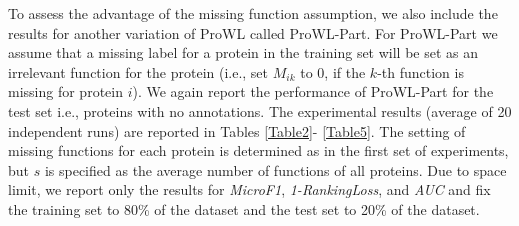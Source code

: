 \documentclass{llncs} %
\begin{document}
To assess the advantage of the missing function assumption, we also include the results for another variation
of ProWL called ProWL-Part.
For ProWL-Part we assume  that a missing label
for a protein in the training set will be set as an irrelevant function for
  the protein (i.e., set $M_{ik}$ to 0, if the $k$-th function is missing for protein $i$).
%
We again report the performance of ProWL-Part for the test set i.e., proteins with no annotations. The experimental results (average of 20 independent runs) are
reported in Tables \ref{Table2}- \ref{Table5}. The setting of missing functions
for each protein is determined as in the first set of experiments, but $s$ is specified as the average number of functions of all proteins. Due to space limit, we
report only the results for \emph{MicroF1}, \emph{1-RankingLoss}, and \emph{AUC} and fix  the training set to 80\% of the dataset and the test set to 20\% of the dataset.
\end{document}
